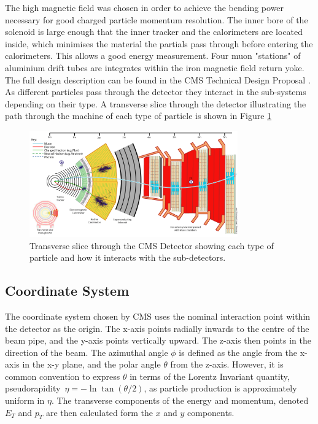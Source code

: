 The high magnetic field was chosen in order to achieve the bending power necessary for good charged particle momentum resolution. The inner bore of the solenoid is large enough that the inner tracker and the calorimeters are located inside, which minimises the material the partials pass through before entering the calorimeters. This allows a good energy measurement. Four muon "stations" of aluminium drift tubes are integrates within the   iron magnetic field return yoke. The full design description can be found in the CMS Technical Design Proposal \cite{CMSTDP}. As different particles pass through the detector they interact in the sub-systems depending on their type. A transverse slice through the detector illustrating the path through the machine of each type of particle is shown in Figure \ref{fig:CMS_Slice} 





\begin{figure}
\centering
\includegraphics[width=0.8\textwidth]{Figures/Detector/CMS_Slice}
\caption{Transverse slice through the CMS Detector showing each type of particle and how it interacts with the sub-detectors.}
\label{fig:CMS_Slice}
\end{figure}
\subsection{Coordinate System}

The coordinate system chosen by CMS uses the nominal interaction point within the detector as the origin. The x-axis points radially inwards to the centre of the beam pipe, and the y-axis points vertically upward. The z-axis then points in the direction of the beam. The azimuthal angle $\phi$ is defined as the angle from the x-axis in the x-y plane, and the polar angle $\theta$ from the z-axis. However, it is common convention to express $\theta$ in terms of the Lorentz Invariant quantity, pseudorapidity~\begin{math}
\eta = -\ln \tan (\theta / 2) 
\end{math}, as particle production is approximately uniform in $\eta$. The transverse components of the energy and momentum, denoted $E_{T}$ and $p_{T}$ are then calculated form the $x$ and $y$ components. 
